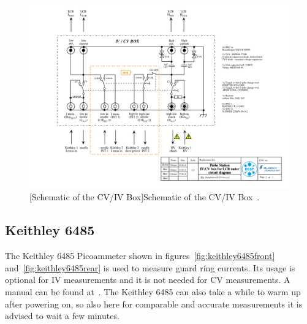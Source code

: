 \documentclass[a4paper]{article}
\begin{document}
\begin{figure}[hbtp]
\includegraphics[width=\linewidth,page=1]{pictures/cvivbox.pdf}
\captionsetup{width=.8\linewidth}%
[Schematic of the CV/IV Box]{Schematic of the CV/IV Box~\cite{ref:cvivboxschem}.}
\label{fig:cvivboxschematic}
\end{figure}

\subsection{Keithley 6485}
\label{sec:keithley6485}

The Keithley 6485 Picoammeter shown in figures~\ref{fig:keithley6485front} and~\ref{fig:keithley6485rear} is used to measure guard ring currents.
Its usage is optional for IV measurements and it is not needed for CV measurements.
A manual can be found at~\cite{ref:keithley6485ref}.
The Keithley 6485 can also take a while to warm up after powering on, so also here for comparable and accurate measurements it is advised to wait a few minutes.\\
\end{document}
